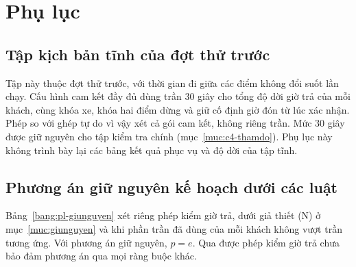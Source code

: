 \appendix
\chapter*{Phụ lục}
\renewcommand{\thesection}{\Alph{section}}
\renewcommand{\thetable}{\thesection.\arabic{table}}
\renewcommand{\theHsection}{appendix.\Alph{section}}
\renewcommand{\theHtable}{appendix.\Alph{section}.\arabic{table}}

\section{Tập kịch bản tĩnh của đợt thử trước}
\label{phuluc:A}

Tập này thuộc đợt thử trước, với thời gian đi giữa các điểm không đổi suốt lần chạy. Cấu hình cam kết đầy đủ dùng trần 30 giây cho tổng độ dời giờ trả của mỗi khách, cùng khóa xe, khóa hai điểm dừng và giữ cố định giờ đón từ lúc xác nhận. Phép so với ghép tự do vì vậy xét cả gói cam kết, không riêng trần. Mức 30 giây được giữ nguyên cho tập kiểm tra chính (mục~\ref{muc:c4-thamdo}). Phụ lục này không trình bày lại các bảng kết quả phục vụ và độ dời của tập tĩnh.

\section{Phương án giữ nguyên kế hoạch dưới các luật}
\label{phuluc:B}
\setcounter{table}{0}

Bảng~\ref{bang:pl-giunguyen} xét riêng phép kiểm giờ trả, dưới giả thiết (N) ở mục~\ref{muc:giunguyen} và khi phần trần đã dùng của mỗi khách không vượt trần tương ứng. Với phương án giữ nguyên, $p=e$. Qua được phép kiểm giờ trả chưa bảo đảm phương án qua mọi ràng buộc khác.

